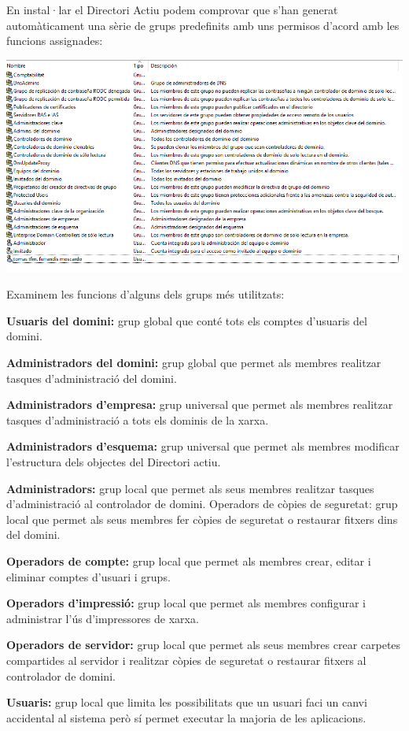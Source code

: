 \documentclass[
  a4paper,
]{article}
\begin{document}
En instal·lar el Directori Actiu podem comprovar que s'han generat
automàticament una sèrie de grups predefinits amb uns permisos d'acord
amb les funcions assignades:

\includegraphics{png/usuaris10.png}

Examinem les funcions d'alguns dels grups més utilitzats:

\textbf{Usuaris del domini:} grup global que conté tots els comptes
d'usuaris del domini.

\textbf{Administradors del domini:} grup global que permet als membres
realitzar tasques d'administració del domini.

\textbf{Administradors d'empresa:} grup universal que permet als membres
realitzar tasques d'administració a tots els dominis de la xarxa.

\textbf{Administradors d'esquema:} grup universal que permet als membres
modificar l'estructura dels objectes del Directori actiu.

\textbf{Administradors:} grup local que permet als seus membres
realitzar tasques d'administració al controlador de domini. Operadors de
còpies de seguretat: grup local que permet als seus membres fer còpies
de seguretat o restaurar fitxers dins del domini.

\textbf{Operadors de compte:} grup local que permet als membres crear,
editar i eliminar comptes d'usuari i grups.

\textbf{Operadors d'impressió:} grup local que permet als membres
configurar i administrar l'ús d'impressores de xarxa.

\textbf{Operadors de servidor:} grup local que permet als seus membres
crear carpetes compartides al servidor i realitzar còpies de seguretat o
restaurar fitxers al controlador de domini.

\textbf{Usuaris:} grup local que limita les possibilitats que un usuari
faci un canvi accidental al sistema però sí permet executar la majoria
de les aplicacions.
\end{document}
